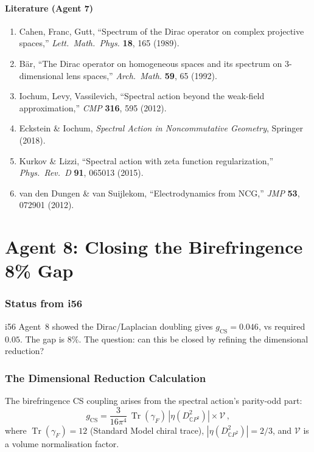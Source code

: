 \documentclass[11pt,a4paper]{article}
\newcommand{\Tr}{\operatorname{Tr}}
\newcommand{\CP}{\mathbb{C}P}
\begin{document}
\subsection{Literature (Agent 7)}

\begin{enumerate}
\item Cahen, Franc, Gutt, ``Spectrum of the Dirac operator on complex projective spaces,'' \textit{Lett.\ Math.\ Phys.} \textbf{18}, 165 (1989).
\item B\"ar, ``The Dirac operator on homogeneous spaces and its spectrum on 3-dimensional lens spaces,'' \textit{Arch.\ Math.} \textbf{59}, 65 (1992).
\item Iochum, Levy, Vassilevich, ``Spectral action beyond the weak-field approximation,'' \textit{CMP} \textbf{316}, 595 (2012).
\item Eckstein \& Iochum, \textit{Spectral Action in Noncommutative Geometry}, Springer (2018).
\item Kurkov \& Lizzi, ``Spectral action with zeta function regularization,'' \textit{Phys.\ Rev.\ D} \textbf{91}, 065013 (2015).
\item van den Dungen \& van Suijlekom, ``Electrodynamics from NCG,'' \textit{JMP} \textbf{53}, 072901 (2012).
\end{enumerate}


\part{Agent 8: Closing the Birefringence 8\% Gap}
\label{part:biref-gap}

\section{Status from i56}

i56 Agent~8 showed the Dirac/Laplacian doubling gives $g_{\mathrm{CS}} = 0.046$, vs required $0.05$. The gap is $8\%$. The question: can this be closed by refining the dimensional reduction?

\section{The Dimensional Reduction Calculation}

The birefringence CS coupling arises from the spectral action's parity-odd part:
\begin{equation}
g_{\mathrm{CS}} = \frac{3}{16\pi^4}\,\Tr(\gamma_F)\,|\eta(D^2_{\CP^2})| \times \mathcal{V}\,,
\end{equation}
where $\Tr(\gamma_F) = 12$ (Standard Model chiral trace), $|\eta(D^2_{\CP^2})| = 2/3$, and $\mathcal{V}$ is a volume normalisation factor.
\end{document}
